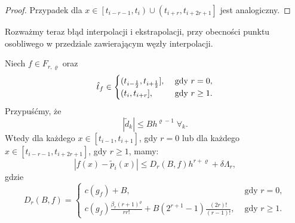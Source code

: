 \documentclass[oik, pdftex, man]{mgrwms}
\begin{document}
\begin{proof}
        \noindent
        Przypadek dla $x \in \left[ t_{i-r-1}, t_{i} \right) \cup \left( t_{i+r}, t_{i+2r+1} \right]$ jest analogiczny.
    \end{proof}

    Rozważmy teraz błąd interpolacji i ekstrapolacji, przy obecności punktu osobliwego w przedziale zawierającym węzły interpolacji.

    \begin{lemma} \label{lem:algMP_3}
        Niech $f \in F_{r, \varrho}$ oraz 
        \begin{equation*}
            \hat{t}_{f} \in \begin{cases}
                (t_{i-\frac{1}{2}}, t_{i + \frac{1}{2}}],    &\text{ gdy } r=0, \\
                (t_{i}, t_{i + r}],                          &\text{ gdy } r \geq 1. \\
            \end{cases}
        \end{equation*}
        Przypuśćmy, że 
        \begin{equation} \label{eq:2}
            |\tilde{d}_{k}| \leq Bh^{\varrho-1} \; \forall_{k}.
        \end{equation}
        Wtedy dla każdego $x \in [t_{i-1}, t_{i+1}]$, gdy $r=0$ lub dla każdego $x \in [t_{i-r-1}, t_{i+2r+1}]$, gdy $r \geq 1$, mamy:
        \begin{equation*}
            |f(x) - \tilde{p}_{i}(x)| \leq D_{r}(B, f)h^{r+\varrho} + \delta\Lambda_{r},
        \end{equation*}
        gdzie 
        \begin{equation*}
            D_{r}(B, f)=\begin{cases} 
                c(g_{f}) + B,   &\text { gdy } r = 0, \\
                c(g_{f}) \frac{\beta_{r}(r+1)^{\varrho}}{r r !}+B\left(2^{r+1}-1\right) \frac{(2 r) !}{(r-1) !},    &\text { gdy } r \geq 1.
            \end{cases}
        \end{equation*}
    \end{lemma}
\end{document}
